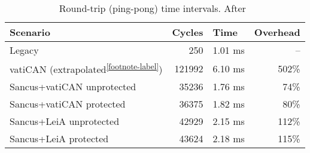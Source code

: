 \begin{table}[h]
    \centering
    \begin{tabular}{@{}lrrr@{}}
    \toprule
    \textbf{Scenario}          & \multicolumn{1}{l}{\textbf{Cycles}} & \multicolumn{1}{l}{\textbf{Time}} & \multicolumn{1}{l}{\textbf{Overhead}} \\ \midrule
    Legacy                     & 250                                 & 1.01 ms                           & –                                     \\
    vatiCAN (extrapolated\textsuperscript{\ref{footnote-label}})    & 121992                              & 6.10 ms                           & 502\%                                 \\
    Sancus+vatiCAN unprotected & 35236                               & 1.76 ms                           & 74\%                                  \\
    Sancus+vatiCAN protected   & 36375                               & 1.82 ms                           & 80\%                                  \\
    Sancus+LeiA unprotected    & 42929                               & 2.15 ms                           & 112\%                                 \\
    Sancus+LeiA protected      & 43624                               & 2.18 ms                           & 115\%                                 \\ \bottomrule
    \end{tabular}
    \caption{Round-trip (ping-pong) time intervals. After~\cite{VanBulck2017}}
\end{table}